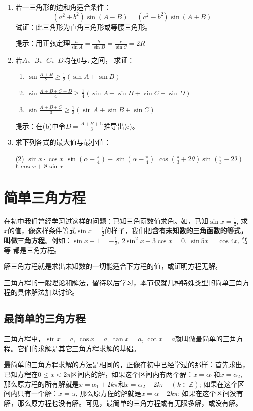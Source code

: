 \begin{enumerate}
\item 若一三角形的边和角适合条件：
\[(a^2+b^2) \sin(A-B) =(a^2-b^2)\sin(A+B)\]
试证：此三角形为直角三角形或等腰三角形。

提示：用正弦定理$\frac{a}{\sin A}=\frac{b}{\sin B}=\frac{c}{\sin C}=2R$
\item 若$A$、$B$、$C$、$D$均在0与$\pi$之间，
求证：
\begin{enumerate}
    \item $\sin\frac{A+B}{2}\ge \frac{1}{2}(\sin A+\sin B)$
    \item $\sin\frac{A+B+C+D}{4}\ge \frac{1}{4}(\sin A+\sin B+\sin C+\sin D)$
    \item $\sin\frac{A+B+C}{3}\ge \frac{1}{3}(\sin A+\sin B+\sin C)$
\end{enumerate}
提示：在(b)中令$D=\frac{A+B+C}{3}$推导出(c)。

\item 求下列各式的最大值与最小值：
\begin{tasks}(2)
    \task $\sin x\cdot \cos x$
    \task $\sin\left(\alpha+\frac{\pi}{4}\right)+\sin\left(\alpha-\frac{\pi}{4}\right)$
    \task $\cos\left(\frac{\pi}{3}+2\theta\right)\sin\left(\frac{\pi}{3}-2\theta\right)$
    \task $6\cos x+8\sin x$
\end{tasks}
\end{enumerate}

\section{简单三角方程}
在初中我们曾经学习过这样的问题：已知三角函数值求角。如，已知$\sin x=\frac{1}{2}$, 求$x$的值，像这样条件等式$\sin x=\frac{1}{2}$的样子，我们把\textbf{含有未知数的三角函数的等式，叫做三角方程}。例如：$\sin x-1=-\frac{1}{2}$, 
$2\sin^2x+3\cos x=0$, $\sin5x=\cos4x$, 等等
都是三角方程。

解三角方程就是求出未知数的一切能适合下方程的值，或证明方程无解。

三角方程的一般理论和解法，留待以后学习，本节仅就几种特殊类型的简单三角方程的具体解法加以讨论。

\subsection{最简单的三角方程}

三角方程中，$\sin x=a$,
$\cos x=a$, $\tan x=a$, $\cot x=a$就叫做最简单的三角方程。它们的求解是其它三角方程求解的基础。

最简单的三角方程求解的方法是相同的，正像在初中已经学过的那样：首先求出，已知方程在$0\le x<2\pi$区间内的解，如果这个区间内有两个解：$x=\alpha_1$和$x=\alpha_2$, 那么原方程的所有解就是$x=\alpha_1+2k\pi$和$x=\alpha_2+2k\pi\quad (k\in\mathbb{Z})$; 如果在这个区间内只有一个解：$x=\alpha$, 那么原方程的解就是$x=\alpha+2k\pi$; 如果在这个区间没有解，那么原方程也没有解。可见，最简单的三角方程或有无限多解，或没有解。



